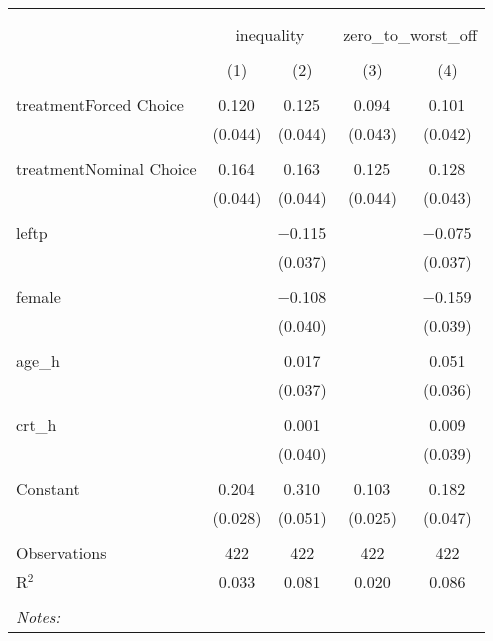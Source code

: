 
\begin{table}[!htbp] \centering 
  \caption{} 
  \label{} 
\begin{tabular}{@{\extracolsep{5pt}}lcccc} 
\\[-1.8ex]\hline 
\hline \\[-1.8ex] 
\\[-1.8ex] & \multicolumn{2}{c}{inequality} & \multicolumn{2}{c}{zero\_to\_worst\_off} \\ 
\\[-1.8ex] & (1) & (2) & (3) & (4)\\ 
\hline \\[-1.8ex] 
 treatmentForced Choice & 0.120$^{}$ & 0.125$^{}$ & 0.094$^{}$ & 0.101$^{}$ \\ 
  & (0.044) & (0.044) & (0.043) & (0.042) \\ 
  & & & & \\ 
 treatmentNominal Choice & 0.164$^{}$ & 0.163$^{}$ & 0.125$^{}$ & 0.128$^{}$ \\ 
  & (0.044) & (0.044) & (0.044) & (0.043) \\ 
  & & & & \\ 
 leftp &  & $-$0.115$^{}$ &  & $-$0.075$^{}$ \\ 
  &  & (0.037) &  & (0.037) \\ 
  & & & & \\ 
 female &  & $-$0.108$^{}$ &  & $-$0.159$^{}$ \\ 
  &  & (0.040) &  & (0.039) \\ 
  & & & & \\ 
 age\_h &  & 0.017 &  & 0.051 \\ 
  &  & (0.037) &  & (0.036) \\ 
  & & & & \\ 
 crt\_h &  & 0.001 &  & 0.009 \\ 
  &  & (0.040) &  & (0.039) \\ 
  & & & & \\ 
 Constant & 0.204$^{}$ & 0.310$^{}$ & 0.103$^{}$ & 0.182$^{}$ \\ 
  & (0.028) & (0.051) & (0.025) & (0.047) \\ 
  & & & & \\ 
Observations & 422 & 422 & 422 & 422 \\ 
R$^{2}$ & 0.033 & 0.081 & 0.020 & 0.086 \\ 
\hline \\[-1.8ex] 
\textit{Notes:} & \multicolumn{4}{l}{} \\ 
\end{tabular} 
\end{table} 
